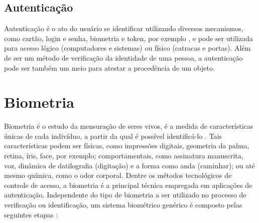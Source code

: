 \subsection{Autenticação}
  
  
  Autenticação é o ato do usuário se identificar utilizando diversos mecanismos, como cartão, login e senha, biometria e token, por exemplo \cite{gerenciamentoid}, e pode ser utilizada para acesso lógico (computadores e sistemas) ou físico (catracas e portas). Além de ser um método de verificação da identidade de uma pessoa, a autenticação pode ser também um meio para atestar a procedência de um objeto.


\section{Biometria\label{secao:biometria}}

  Biometria é o estudo da mensuração de seres vivos, é a medida de características únicas de cada indivíduo, a partir da qual é possível identificá-lo \cite{handbookbiometrics}. Tais características podem ser físicas, como impressões digitais, geometria da palma, retina, íris, face, por exemplo; comportamentais, como assinatura manuscrita, voz, dinâmica de datilografia (digitação) e a forma como anda (caminhar); ou até mesmo química, como o odor corporal.  Dentre os métodos tecnológicos de controle de acesso, a biometria é a principal técnica empregada em aplicações de autenticação. Independente do tipo de biometria a ser utilizado no processo de verificação ou identificação, um sistema biométrico genérico é composto pelas seguintes etapas \cite{patel2008information, duffy2008handbook}:
  

